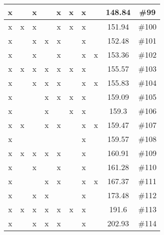 \begin{center}
\begin{longtable}{|c|c|c|c|c|c|c|c|c|c|}
 x &  &  x &  &  x &  x &  x &  & 148.84 & \#99 \\ \hline
 x &  x &  x &  &  x &  x &  x &  & 151.94 & \#100 \\ \hline
 x &  &  x &  x &  x &  &  x &  & 152.48 & \#101 \\ \hline
 x &  &  x &  &  x &  &  x &  x & 153.36 & \#102 \\ \hline
 x &  x &  x &  x &  x &  x &  x &  & 155.57 & \#103 \\ \hline
 x &  &  x &  x &  x &  &  x &  x & 155.83 & \#104 \\ \hline
 x &  &  &  x &  x &  x &  x &  & 159.09 & \#105 \\ \hline
 x &  &  &  x &  &  x &  x &  & 159.3 & \#106 \\ \hline
 x &  x &  &  x &  x &  &  x &  x & 159.47 & \#107 \\ \hline
 x &  &  &  &  &  &  x &  & 159.57 & \#108 \\ \hline
 x &  x &  x &  x &  x &  &  x &  & 160.91 & \#109 \\ \hline
 x &  &  x &  &  x &  &  x &  & 161.28 & \#110 \\ \hline
 x &  &  &  x &  x &  &  x &  x & 167.37 & \#111 \\ \hline
 x &  &  x &  x &  &  &  x &  & 173.48 & \#112 \\ \hline
 x &  x &  x &  x &  x &  x &  x &  & 191.6 & \#113 \\ \hline
 x &  &  x &  x &  x &  &  x &  & 202.93 & \#114 \\ \hline
\end{longtable}
\label{table:windProdInputParams}
\end{center}
\normalsize
